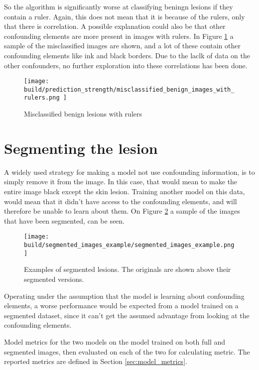 So the algorithm is significantly worse at classifying beningn lesions if they contain a ruler.
Again, this does not mean that it is because of the rulers, only that there is correlation.
A possible explanation could also be that other confounding elements are more present in images with rulers.
In Figure \ref{fig:prediction_strength_ruler_misclassified_benign} a sample of the misclassified images are shown,
and a lot of these contain other confounding elements like ink and black borders.
Due to the laclk of data on the other confounders, no further exploration into these correlations has been done.

\begin{figure}
    \centering
    \texttt{[image: 
        build/prediction\_strength/misclassified\_benign\_images\_with\_rulers.png
    ]}
    \caption{Misclassified benign lesions with rulers}
    \label{fig:prediction_strength_ruler_misclassified_benign}
\end{figure}

\section{Segmenting the lesion}
A widely used strategy for making a model not use confounding information, is to simply remove it from the image.
In this case, that would mean to make the entire image black except the skin lesion.
Training another model on this data, would mean that it didn't have access to the confounding elements,
and will therefore be unable to learn about them.
On Figure \ref{fig:segmented_images_example} a sample of the images that have been segmented,
can be seen.

\begin{figure}[h]
    \centering
    \texttt{[image: 
        build/segmented\_images\_example/segmented\_images\_example.png
    ]}
    \caption{Examples of segmented lesions. The originals are shown above their segmented versions.}
    \label{fig:segmented_images_example}
\end{figure}

Operating under the assumption that the model is learning about confounding elements,
a worse performance would be expected from a model trained on a segmented dataset,
since it can't get the assumed advantage from looking at the confounding elements.

\begin{table}
    
    \caption[Model metrics for model trained on both full and segmented images]{
        Model metrics for the two models on the model trained on both full and segmented images,
        then evaluated on each of the two for calculating metric.
        The reported metrics are defined in Section \ref{sec:model_metrics}.
    }
    \label{tab:segmented_metrics}
\end{table}


